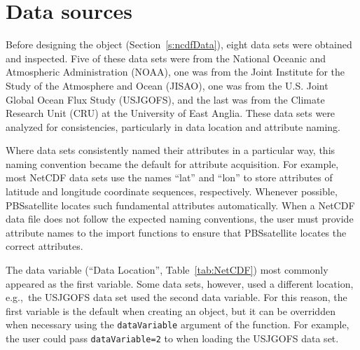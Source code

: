 \documentclass[11pt]{report}
\begin{document}
\section{Data sources}

Before designing the  object (Section~\ref{s:ncdfData}), eight data sets were obtained and inspected.
Five of these data sets were from the National Oceanic and Atmospheric Administration (NOAA), one was from the Joint Institute for the Study of the Atmosphere and Ocean (JISAO), one was from the U.S. Joint Global Ocean Flux Study (USJGOFS), and the last was from the Climate Research Unit (CRU) at the University of East Anglia.
These data sets were analyzed for consistencies, particularly in data location and attribute naming.

Where data sets consistently named their attributes in a particular way, this naming convention became the default for  attribute acquisition.
For example, most NetCDF data sets use the names ``lat'' and ``lon'' to store attributes of latitude and longitude coordinate sequences, respectively.
Whenever possible, PBSsatellite locates such fundamental attributes automatically.
When a NetCDF data file does not follow the expected naming conventions, the user must provide attribute names to the import functions to ensure that PBSsatellite locates the correct attributes.   

The data variable (``Data Location'', Table~\ref{tab:NetCDF}) most commonly appeared as the first variable.
Some data sets, however, used a different location, e.g.,~the USJGOFS data set used the second data variable.
For this reason, the first variable is the default when creating an  object, but it can be overridden when necessary using the \texttt{dataVariable} argument of the  function.
For example, the user could pass \texttt{dataVariable=2} to  when loading the USJGOFS data set.
\end{document}

